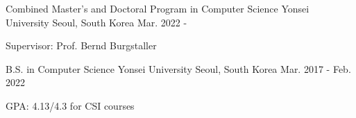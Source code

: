 

\begin{cventries}

  \cventry
    {Combined Master's and Doctoral Program in Computer Science} %
    {Yonsei University} %
    {Seoul, South Korea} %
    {Mar. 2022 - } %
    {
      \begin{cvitems} %
        \item {Supervisor: Prof. Bernd Burgstaller}
      \end{cvitems}
    }

  \cventry
    {B.S. in Computer Science} %
    {Yonsei University} %
    {Seoul, South Korea} %
    {Mar. 2017 - Feb. 2022} %
    {
      \begin{cvitems} %
        \item {GPA: 4.13/4.3 for CSI courses}
      \end{cvitems}
    }
\end{cventries}
